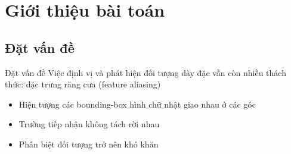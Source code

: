\documentclass[11pt]{beamer}
\theoremstyle{definition}
\theoremstyle{plain}
\theoremstyle{plain}
\theoremstyle{remark}
\begin{document}

\section{Giới thiệu bài toán}

\subsection{Đặt vấn đề}
\begin{frame}{Đặt vấn đề}
	Việc định vị và phát hiện đối tượng dày đặc vẫn còn nhiều thách thức: đặc trưng răng cưa (feature aliasing)
	\begin{itemize}
		\item Hiện tượng các bounding-box hình chữ nhật giao nhau ở các góc
		\item Trường tiếp nhận không tách rời nhau
		\item Phân biệt đối tượng trở nên khó khăn
	\end{itemize}
\end{frame}
\end{document}
